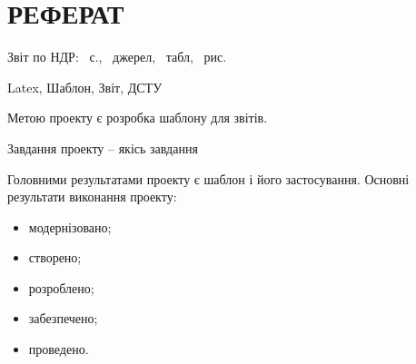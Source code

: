 \chapter*{РЕФЕРАТ}

Звіт по НДР: \pageref{LastPage}~с., ~джерел, 
~табл, ~рис.

Latex, Шаблон, Звіт, ДСТУ


Метою проекту є розробка шаблону для звітів. 

Завдання проекту – якісь завдання

Головними результатами проекту є шаблон і його застосування. Основні результати виконання проекту:

\begin{itemize}
\item модернізовано;
\item створено;
\item розроблено;
\item забезпечено;
\item проведено.
\end{itemize}




